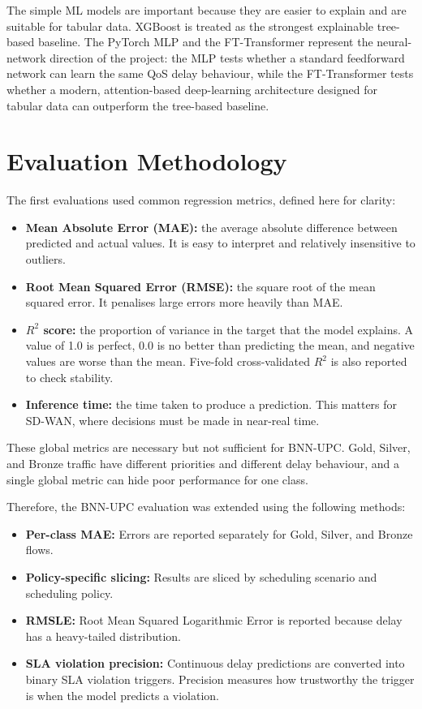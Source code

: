 \documentclass[a4paper,12pt]{Classes/RoboticsLaTeX}
\begin{document}
The simple ML models are important because they are easier to explain and are suitable for tabular data. XGBoost is treated as the strongest explainable tree-based baseline. The PyTorch MLP and the FT-Transformer represent the neural-network direction of the project: the MLP tests whether a standard feedforward network can learn the same QoS delay behaviour, while the FT-Transformer tests whether a modern, attention-based deep-learning architecture designed for tabular data can outperform the tree-based baseline.

\section{Evaluation Methodology}

The first evaluations used common regression metrics, defined here for clarity:

\begin{itemize}
    \item \textbf{Mean Absolute Error (MAE):} the average absolute difference between predicted and actual values. It is easy to interpret and relatively insensitive to outliers.
    \item \textbf{Root Mean Squared Error (RMSE):} the square root of the mean squared error. It penalises large errors more heavily than MAE.
    \item \textbf{$R^2$ score:} the proportion of variance in the target that the model explains. A value of 1.0 is perfect, 0.0 is no better than predicting the mean, and negative values are worse than the mean. Five-fold cross-validated $R^2$ is also reported to check stability.
    \item \textbf{Inference time:} the time taken to produce a prediction. This matters for SD-WAN, where decisions must be made in near-real time.
\end{itemize}

These global metrics are necessary but not sufficient for BNN-UPC. Gold, Silver, and Bronze traffic have different priorities and different delay behaviour, and a single global metric can hide poor performance for one class.

Therefore, the BNN-UPC evaluation was extended using the following methods:

\begin{itemize}
    \item \textbf{Per-class MAE:} Errors are reported separately for Gold, Silver, and Bronze flows.
    \item \textbf{Policy-specific slicing:} Results are sliced by scheduling scenario and scheduling policy.
    \item \textbf{RMSLE:} Root Mean Squared Logarithmic Error is reported because delay has a heavy-tailed distribution.
    \item \textbf{SLA violation precision:} Continuous delay predictions are converted into binary SLA violation triggers. Precision measures how trustworthy the trigger is when the model predicts a violation.
\end{itemize}
\end{document}
